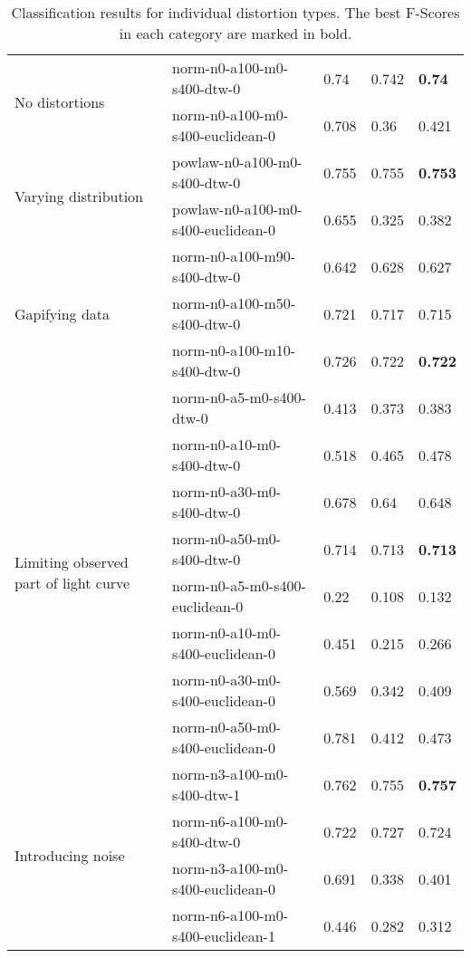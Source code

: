 \documentclass[10pt]{article}
\begin{document}
\begin{table}[ht!]
\begin{tabular}{|l|l|lll|}
\multirow{2}{*}{No distortions}
 & norm-n0-a100-m0-s400-dtw-0 & 0.74 & 0.742 & \textbf{0.74} \\ 
 & norm-n0-a100-m0-s400-euclidean-0 & 0.708 & 0.36 & 0.421 \\ \hline

\multirow{2}{*}{Varying distribution}
 & powlaw-n0-a100-m0-s400-dtw-0 & 0.755 & 0.755 & \textbf{0.753} \\
 & powlaw-n0-a100-m0-s400-euclidean-0 & 0.655 & 0.325 & 0.382 \\ \hline

\multirow{3}{*}{Gapifying data} 
 & norm-n0-a100-m90-s400-dtw-0 & 0.642 & 0.628 & 0.627 \\
 & norm-n0-a100-m50-s400-dtw-0 & 0.721 & 0.717 & 0.715 \\ 
 & norm-n0-a100-m10-s400-dtw-0 & 0.726 & 0.722 & \textbf{0.722} \\ \hline

\multirow{8}{*}{Limiting observed part of light curve}
 & norm-n0-a5-m0-s400-dtw-0 & 0.413 & 0.373 & 0.383 \\ 
 & norm-n0-a10-m0-s400-dtw-0 & 0.518 & 0.465 & 0.478 \\ 
 & norm-n0-a30-m0-s400-dtw-0 & 0.678 & 0.64 & 0.648 \\ 
 & norm-n0-a50-m0-s400-dtw-0 & 0.714 & 0.713 & \textbf{0.713} \\ 
 & norm-n0-a5-m0-s400-euclidean-0 & 0.22 & 0.108 & 0.132 \\
 & norm-n0-a10-m0-s400-euclidean-0 & 0.451 & 0.215 & 0.266 \\ 
 & norm-n0-a30-m0-s400-euclidean-0 & 0.569 & 0.342 & 0.409 \\ 
 & norm-n0-a50-m0-s400-euclidean-0 & 0.781 & 0.412 & 0.473 \\ \hline


\multirow{4}{*}{Introducing noise}
 & norm-n3-a100-m0-s400-dtw-1 & 0.762 & 0.755 & \textbf{0.757} \\ 
 & norm-n6-a100-m0-s400-dtw-0 & 0.722 & 0.727 & 0.724 \\ 
 & norm-n3-a100-m0-s400-euclidean-0 & 0.691 & 0.338 & 0.401 \\ 
 & norm-n6-a100-m0-s400-euclidean-1 & 0.446 & 0.282 & 0.312 \\ \hline

	\end{tabular}
	\label{tab:individualresults}
	\caption{Classification results for individual distortion types. The best F-Scores in each category are marked in bold.}
	\end{table}
\end{document}
